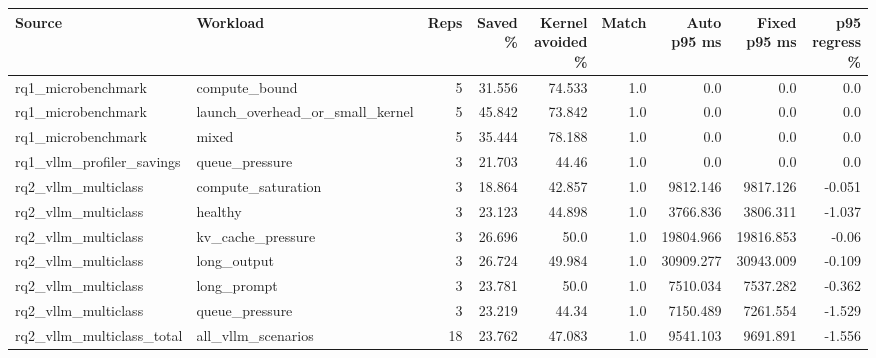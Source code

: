 \begin{tabular}{llrrrrrrr}
\hline
Source & Workload & Reps & Saved \% & Kernel avoided \% & Match & Auto p95 ms & Fixed p95 ms & p95 regress \% \\
\hline
rq1_microbenchmark & compute_bound & 5 & 31.556 & 74.533 & 1.0 & 0.0 & 0.0 & 0.0 \\
rq1_microbenchmark & launch_overhead_or_small_kernel & 5 & 45.842 & 73.842 & 1.0 & 0.0 & 0.0 & 0.0 \\
rq1_microbenchmark & mixed & 5 & 35.444 & 78.188 & 1.0 & 0.0 & 0.0 & 0.0 \\
rq1_vllm_profiler_savings & queue_pressure & 3 & 21.703 & 44.46 & 1.0 & 0.0 & 0.0 & 0.0 \\
rq2_vllm_multiclass & compute_saturation & 3 & 18.864 & 42.857 & 1.0 & 9812.146 & 9817.126 & -0.051 \\
rq2_vllm_multiclass & healthy & 3 & 23.123 & 44.898 & 1.0 & 3766.836 & 3806.311 & -1.037 \\
rq2_vllm_multiclass & kv_cache_pressure & 3 & 26.696 & 50.0 & 1.0 & 19804.966 & 19816.853 & -0.06 \\
rq2_vllm_multiclass & long_output & 3 & 26.724 & 49.984 & 1.0 & 30909.277 & 30943.009 & -0.109 \\
rq2_vllm_multiclass & long_prompt & 3 & 23.781 & 50.0 & 1.0 & 7510.034 & 7537.282 & -0.362 \\
rq2_vllm_multiclass & queue_pressure & 3 & 23.219 & 44.34 & 1.0 & 7150.489 & 7261.554 & -1.529 \\
rq2_vllm_multiclass_total & all_vllm_scenarios & 18 & 23.762 & 47.083 & 1.0 & 9541.103 & 9691.891 & -1.556 \\
\hline
\end{tabular}
